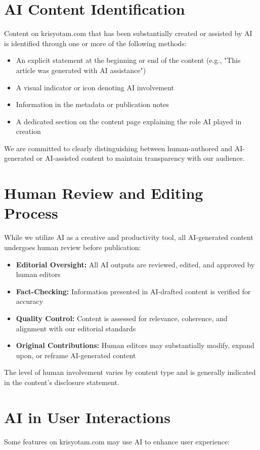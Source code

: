 \documentclass[11pt]{article}
\begin{document}
\section{AI Content Identification}
Content on krisyotam.com that has been substantially created or assisted by AI is identified through one or more of the following methods:
\begin{itemize}
  \item An explicit statement at the beginning or end of the content (e.g., "This article was generated with AI assistance")
  \item A visual indicator or icon denoting AI involvement
  \item Information in the metadata or publication notes
  \item A dedicated section on the content page explaining the role AI played in creation
\end{itemize}

We are committed to clearly distinguishing between human-authored and AI-generated or AI-assisted content to maintain transparency with our audience.

\section{Human Review and Editing Process}
While we utilize AI as a creative and productivity tool, all AI-generated content undergoes human review before publication:
\begin{itemize}
  \item \textbf{Editorial Oversight:} All AI outputs are reviewed, edited, and approved by human editors
  \item \textbf{Fact-Checking:} Information presented in AI-drafted content is verified for accuracy
  \item \textbf{Quality Control:} Content is assessed for relevance, coherence, and alignment with our editorial standards
  \item \textbf{Original Contributions:} Human editors may substantially modify, expand upon, or reframe AI-generated content
\end{itemize}

The level of human involvement varies by content type and is generally indicated in the content's disclosure statement.

\section{AI in User Interactions}
Some features on krisyotam.com may use AI to enhance user experience:
\end{document}
